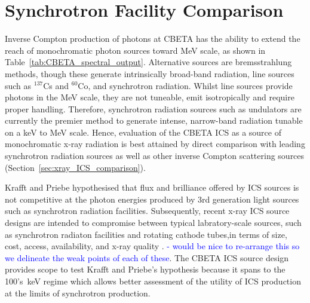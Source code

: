 \documentclass[../main.tex]{subfiles}
\begin{document}

\section{Synchrotron Facility Comparison}
\label{sec:synchrotron_facility_comparison}


Inverse Compton production of photons at CBETA has the ability to extend the reach of monochromatic photon sources toward \si{\mega\electronvolt} scale, as shown in Table~\ref{tab:CBETA_spectral_output}. Alternative sources are bremsstrahlung methods, though these generate intrinsically broad-band radiation, line sources such as $^{137}$Cs and $^{60}$Co, and synchrotron radiation. Whilst line sources provide photons in the \si{\mega\electronvolt} scale, they are not tuneable, emit isotropically and require proper handling. Therefore, synchrotron radiation sources such as undulators are currently the premier method to generate intense, narrow-band radiation tunable on a \si{\kilo\electronvolt} to \si{\mega\electronvolt} scale. Hence, evaluation of the CBETA ICS as a source of monochromatic x-ray radiation is best attained by direct comparison with leading synchrotron radiation sources as well as other inverse Compton scattering sources (Section~\ref{sec:xray_ICS_comparison}).   

Krafft and Priebe \cite{krafft2010compton} hypothesised that flux and brilliance offered by ICS sources is not competitive at the photon energies produced by 3rd generation light sources such as synchrotron radiation facilities. Subsequently, recent x-ray ICS source designs are intended to compromise between typical labratory-scale sources, such as synchrotron radiaton facilities and rotating cathode tubes,in terms of size, cost, access, availability, and x-ray quality \cite{deitrick2018high}. \textcolor{blue}{- would be nice to re-arrange this so we delineate the weak points of each of these}.
The CBETA ICS source design provides scope to test Krafft and Priebe's hypothesis because it spans to the 100's~\si{\kilo\electronvolt} regime which allows better assessment of the utility of ICS production at the limits of synchrotron production.
\end{document}
